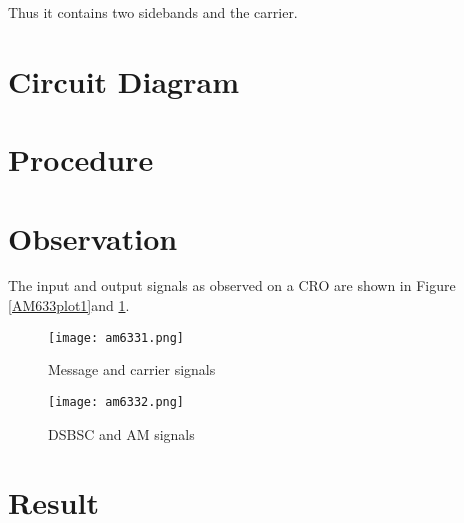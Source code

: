 Thus it contains two sidebands and the carrier.

\section*{Circuit Diagram}
\section*{Procedure}
\section*{Observation}
The input and output signals as observed on a CRO are shown in Figure \ref{AM633plot1}and \ref{AM633plot2}.
\begin{figure}
\texttt{[image: am6331.png]}
\caption{Message and carrier signals}
\label{AM633plot1}
\texttt{[image: am6332.png]}
\caption{DSBSC and AM signals}
\label{AM633plot2}
\end{figure}


\section*{Result}